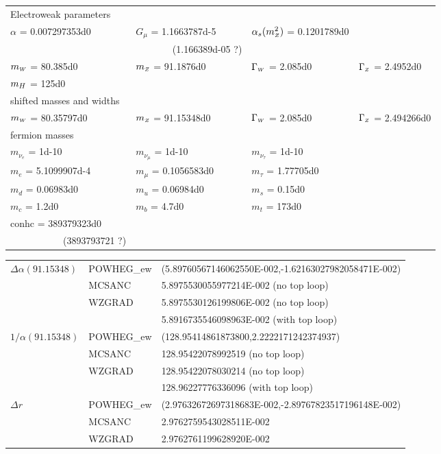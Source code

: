 \begin{tabular}{llll}
Electroweak parameters & &\\  
  $\alpha$                 = 0.007297353d0 &
  $G_\mu$                   = 1.1663787d-5  &
  $\alpha_s(m_{\scriptscriptstyle Z}^2)$        = 0.1201789d0 &\\
  &~~~~~~~ (1.166389d-05 ?) & & \\
  $m_{\scriptscriptstyle W}$                    = 80.385d0 &
  $m_{\scriptscriptstyle Z}$                    = 91.1876d0 & 
  $\Gamma_{\scriptscriptstyle W}$           = 2.085d0 & 
  $\Gamma_{\scriptscriptstyle Z}$           = 2.4952d0  \\
  $m_H$                    = 125d0 & & & \\
  shifted  masses and widths & &\\
  $m_{\scriptscriptstyle W}$                    = 80.35797d0 &
   $m_{\scriptscriptstyle Z}$                    = 91.15348d0 & 
  $\Gamma_{\scriptscriptstyle W}$          = 2.085d0 & 
   $\Gamma_{\scriptscriptstyle Z}$          = 2.494266d0  \\
     fermion masses & & & \\
  $m_{\nu_e}$        = 1d-10 &
  $m_{\nu_\mu}$       = 1d-10 &
  $m_{\nu_\tau}$      = 1d-10 &  \\
  $m_e$             = 5.1099907d-4 &
  $m_\mu$           = 0.1056583d0 &
  $m_\tau$          = 1.77705d0 & \\
  $m_d$                   = 0.06983d0 &
  $m_u$                   = 0.06984d0 &
  $m_s$                   = 0.15d0 & \\
  $m_c$                   = 1.2d0 &
  $m_b$                   = 4.7d0 &
  $m_t$                   = 173d0 & \\
  conhc                    = 389379323d0  & & & \\
  ~~~~~~~~~~~(3893793721 ?) & & & \\
\end{tabular}
\begin{tabular}{lll}
  $ \Delta \alpha (91.15348)$
  & POWHEG\_ew
  &  $\!\!\!$(5.89760567146062550E-002,-1.62163027982058471E-002) \\
  &  MCSANC
  &  5.8975530055977214E-002 (no top loop) \\
  &  WZGRAD
  &  5.8975530126199806E-002 (no top loop) \\
  &
  &  5.8916735546098963E-002 (with top loop) \\
  $1/\alpha(91.15348)$
  & POWHEG\_ew
  & $\!\!\!$(128.95414861873800,2.2222171242374937) \\
  & MCSANC
  & 128.95422078992519 (no top loop)       \\
  & WZGRAD
  & 128.95422078030214 (no top loop)  \\
  &
  & 128.96227776336096 (with top loop) \\
  $\Delta r$
  &  POWHEG\_ew
  &  $\!\!\!$(2.97632672697318683E-002,-2.89767823517196148E-002) \\
  & MCSANC
  & 2.9762759543028511E-002\\                                                   
  & WZGRAD
  & 2.9762761199628920E-002
\end{tabular}
\vskip0.5cm

